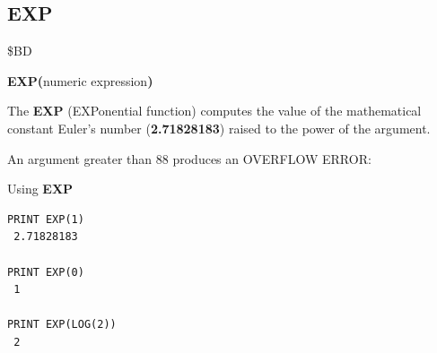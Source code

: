 \subsection{EXP}
\begin{description}[leftmargin=2cm,style=nextline]
\item [Token:] \$BD
\item [Format:] {\bf EXP(}numeric expression{\bf)}
\item [Usage:] The {\bf EXP} (EXPonential function) computes
               the value of the mathematical constant
               Euler's number ({\bf 2.71828183})
               raised to the power of the
               argument.

\item [Remarks:] An argument greater than 88 produces
                 an OVERFLOW ERROR:
\item [Examples:] Using {\bf EXP}
\begin{tcolorbox}[colback=black,coltext=white]
\verbatimfont{\codefont}
\begin{verbatim}
PRINT EXP(1)
 2.71828183

PRINT EXP(0)
 1

PRINT EXP(LOG(2))
 2
\end{verbatim}
\end{tcolorbox}
\end{description}


\newpage
